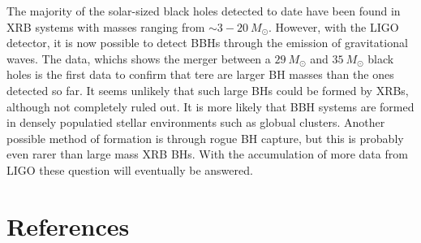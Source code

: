 \documentclass[a4paper]{article} %
\newcommand{\ms}[1]{\SI{#1}{M_{\odot}}}
\begin{document}
The majority of the solar-sized black holes detected to date have been found in XRB systems with masses ranging from $\sim 3- \ms{20}$. However, with the LIGO detector, it is now possible to detect BBHs through the emission of gravitational waves. The data, whichs shows the merger between a $\SI{29}{M_\odot}$ and $\SI{35}{M_\odot}$ black holes is the first data to confirm that tere are larger BH masses than the ones detected so far. It seems unlikely that such large BHs could be formed by XRBs, although not completely ruled out. It is more likely that BBH systems are formed in densely populatied stellar environments such as globual clusters. Another possible method of formation is through rogue BH capture, but this is probably even rarer than large mass XRB BHs. With the accumulation of more data from LIGO these question will eventually be answered.

\pagebreak

\section{References}



\end{document}
